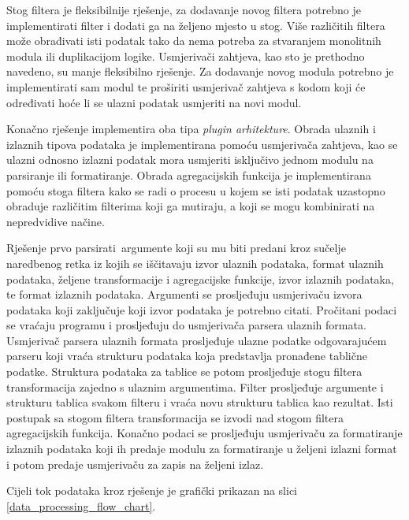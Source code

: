 \documentclass[times, utf8, zavrsni]{fer}
\begin{document}
Stog filtera je fleksibilnije rješenje, za dodavanje novog filtera potrebno
je implementirati filter i dodati ga na željeno mjesto u stog. Više različitih
filtera može obrađivati isti podatak tako da nema potreba za stvaranjem
monolitnih modula ili duplikacijom logike. Usmjerivači zahtjeva, kao sto je
prethodno
navedeno, su manje fleksibilno rješenje. Za dodavanje novog modula potrebno je
implementirati sam modul te proširiti usmjerivač zahtjeva s kodom koji će
određivati hoće li
se ulazni podatak usmjeriti na novi modul.

Konačno rješenje implementira
oba tipa \textit{plugin arhitekture}. Obrada ulaznih i izlaznih tipova podataka
je
implementirana pomoću usmjerivača zahtjeva, kao se ulazni odnosno izlazni
podatak mora
usmjeriti isključivo jednom modulu na parsiranje ili formatiranje. Obrada
agregacijskih funkcija je implementirana pomoću stoga filtera kako se
radi o procesu u kojem se isti podatak uzastopno obraduje različitim filterima
koji ga mutiraju, a koji se mogu kombinirati na nepredvidive načine.

Rješenje prvo parsirati argumente koji su mu biti predani kroz sučelje
naredbenog retka iz kojih se iščitavaju izvor ulaznih podataka, format ulaznih
podataka, željene transformacije i agregacijske funkcije, izvor izlaznih
podataka, te format izlaznih podataka. Argumenti se prosljeđuju usmjerivaču
izvora podataka koji zaključuje koji izvor podataka je potrebno citati.
Pročitani podaci se vraćaju programu i prosljeđuju do usmjerivača parsera
ulaznih formata. Usmjerivač parsera ulaznih formata prosljeđuje ulazne podatke
odgovarajućem parseru koji vraća strukturu podataka koja predstavlja pronađene
tablične podatke. Struktura podataka za tablice se potom prosljeđuje  stogu
filtera transformacija zajedno s ulaznim argumentima. Filter prosljeđuje
argumente i strukturu tablica svakom filteru i vraća novu strukturu tablica
kao rezultat. Isti postupak sa stogom filtera transformacija se izvodi nad
stogom filtera agregacijskih funkcija. Konačno podaci se prosljeđuju
usmjerivaču za formatiranje izlaznih podataka koji ih predaje modulu za
formatiranje u željeni izlazni format i potom predaje usmjerivaču za zapis na
željeni izlaz.

Cijeli tok podataka kroz rješenje je grafički prikazan na
slici \ref{data_processing_flow_chart}.
\end{document}
